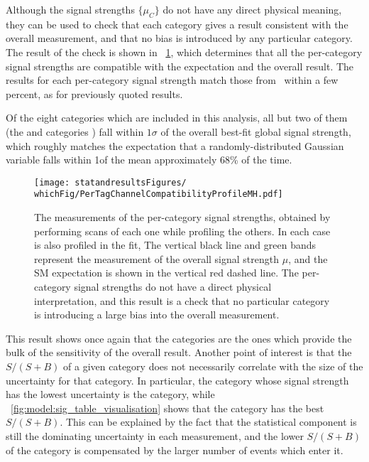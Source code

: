 Although the signal strengths $\{\mu_C\}$ do not have any direct physical meaning, they can be used to check that each category gives a result consistent with the overall measurement, and that no bias is introduced by any particular category. The result of the check is shown in \Fig~\ref{fig:statandresults:mu_per_tag}, which determines that all the per-category signal strengths are compatible with the \SM expectation and the overall result. The results for each per-category signal strength match those from~\cite{CMS-PAS-HIG-16-020} within a few percent, as for previously quoted results. 

Of the eight categories which are included in this analysis, all but two of them (the  and  categories ) fall within $1\sigma$ of the overall best-fit global signal strength, which roughly matches the expectation that a randomly-distributed Gaussian variable falls within 1\sigma of the mean approximately 68\% of the time.

\begin{figure}[ht!]
\centering
\texttt{[image: statandresultsFigures/\\whichFig/PerTagChannelCompatibilityProfileMH.pdf]} 
\caption{The measurements of the per-category signal strengths, obtained by performing \DNLL scans of each one while profiling the others. In each case \mH is also profiled in the fit, The vertical black line and green bands represent the measurement of the overall signal strength $\mu$, and the SM expectation is shown in the vertical red dashed line. The per-category signal strengths do not have a direct physical interpretation, and this result is a check that no particular category is introducing a large bias into the overall measurement.}

\label{fig:statandresults:mu_per_tag}

\end{figure}

This result shows once again that the \Untagged categories are the ones which provide the bulk of the sensitivity of the overall result. Another point of interest is that the $S/(S+B)$ of a given category does not necessarily correlate with the size of the uncertainty for that category. In particular, the category whose signal strength has the lowest uncertainty is the  category, while \Fig~\ref{fig:model:sig_table_visualisation} shows that the  category has the best $S/(S+B)$. This can be explained by the fact that the statistical component is still the dominating uncertainty in each measurement, and the lower $S/(S+B)$ of the  category is compensated by the larger number of events which enter it. 

